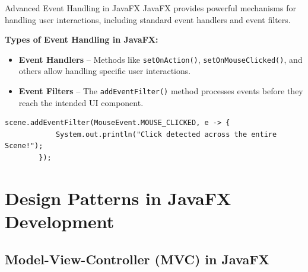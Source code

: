 \documentclass[aspectratio=169, table]{beamer}
\begin{document}
\begin{frame}[fragile]{Advanced Event Handling in JavaFX}
	\vspace{20pt}
	JavaFX provides powerful mechanisms for handling user interactions,  
	including standard event handlers and event filters.
	
	\bigskip
	\textbf{Types of Event Handling in JavaFX:}
	\begin{itemize}
		\item \textbf{Event Handlers} – Methods like \texttt{setOnAction()}, \texttt{setOnMouseClicked()},  
		and others allow handling specific user interactions.
		\item \textbf{Event Filters} – The \texttt{addEventFilter()} method processes events  
		before they reach the intended UI component.
	\end{itemize}
	
	\bigskip
	\begin{lstlisting}[style=JavaStyle]
		scene.addEventFilter(MouseEvent.MOUSE_CLICKED, e -> {
			System.out.println("Click detected across the entire Scene!");
		});
	\end{lstlisting}
	
\end{frame}

\section{Design Patterns in JavaFX Development}

\subsection{Model-View-Controller (MVC) in JavaFX}
\end{document}
